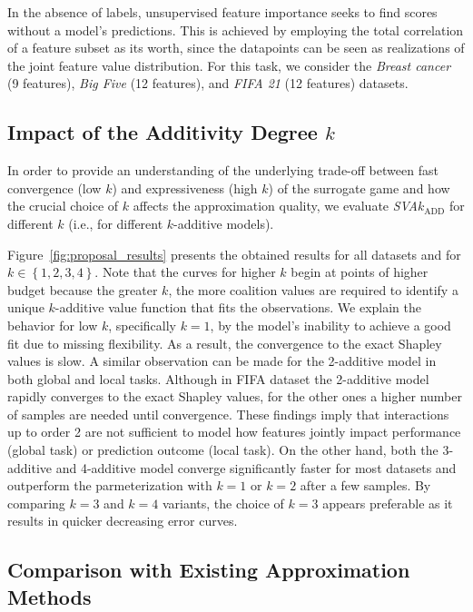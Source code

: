 In the absence of labels, unsupervised feature importance \citep{Balestra.2022} seeks to find scores without a model's predictions.
This is achieved by employing the total correlation of a feature subset as its worth, since the datapoints can be seen as realizations of the joint feature value distribution.
For this task, we consider the \emph{Breast cancer} (9 features), \emph{Big Five} (12 features), and \emph{FIFA 21} (12 features) datasets.

\subsection{Impact of the Additivity Degree $k$}
\label{subsec:degree}

In order to provide an understanding of the underlying trade-off between fast convergence (low $k$) and expressiveness (high $k$) of the surrogate game and how the crucial choice of $k$ affects the approximation quality, we evaluate \emph{SVA}$k_{\text{ADD}}$ for different $k$ (i.e., for different $k$-additive models).

Figure~\ref{fig:proposal_results} presents the obtained results for all datasets and for $k \in \left\{1,2,3,4 \right\}$.
Note that the curves for higher $k$ begin at points of higher budget because the greater $k$, the more coalition values are required to identify a unique $k$-additive value function that fits the observations.
We explain the behavior for low $k$, specifically $k=1$, by the model's inability to achieve a good fit due to missing flexibility.
As a result, the convergence to the exact Shapley values is slow.
A similar observation can be made for the 2-additive model in both global and local tasks.
Although in FIFA dataset the 2-additive model rapidly converges to the exact Shapley values, for the other ones a higher number of samples are needed until convergence.
These findings imply that interactions up to order 2 are not sufficient to model how features jointly impact performance (global task) or prediction outcome (local task).
On the other hand, both the 3-additive and 4-additive model converge significantly faster for most datasets and outperform the parmeterization with $k=1$ or $k=2$ after a few samples.
By comparing $k=3$ and $k=4$ variants, the choice of $k=3$ appears preferable as it results in quicker decreasing error curves. 

\subsection{Comparison with Existing Approximation Methods}
\label{subsec:performance}

